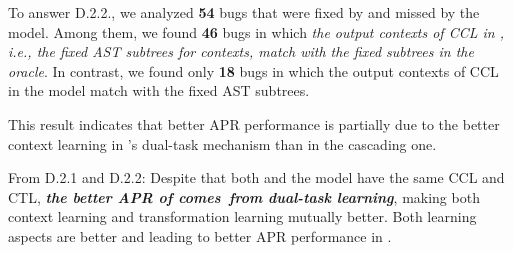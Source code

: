 To answer D.2.2., we analyzed {\bf 54} bugs that were fixed by {\tool}
and missed by the  model. Among them, we found {\bf
  46} bugs in which {\em the output contexts of CCL in {\tool}, i.e.,
  the fixed AST subtrees for contexts, match with the fixed subtrees
  in the oracle}. In contrast, we found only {\bf 18} bugs in which
the output contexts of CCL in the  model match with
the fixed AST subtrees.

This result indicates that better APR performance is partially due to
the better context learning in {\tool}'s dual-task mechanism than in
the cascading one.


From D.2.1 and D.2.2: Despite that both {\tool} and the
 model have the same CCL and CTL, {\bf {\em the better
    APR of {\tool} comes~from dual-task learning}},
 making both context learning and transformation learning mutually
 better. Both learning aspects are better and leading
 to better APR performance in {\tool}.









